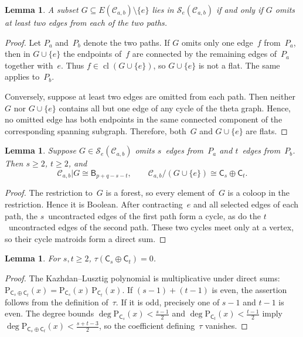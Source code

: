 \documentclass[12pt,letterpaper,english]{amsart}
\theoremstyle{teoremas}
\newtheorem{lemma}[theorem]{Lemma}
\theoremstyle{definition}
\DeclareMathOperator{\cl}{cl}
\newcommand{\C}{\mathsf{C}}
\newcommand{\B}{\mathsf{B}}
\newcommand{\PP}{\mathrm{P}}
\newcommand{\Se}{\mathcal{S}_e}
\begin{document}
\begin{lemma}\label{lem:glued-Se}
A subset $G \subseteq E(\mathcal{C}_{a,b}) \setminus \{e\}$ lies in
$\Se(\mathcal{C}_{a,b})$ if and only if $G$ omits at least two edges
from each of the two paths.
\end{lemma}

\begin{proof}
Let $P_a$ and~$P_b$ denote the two paths.
If $G$ omits only one edge~$f$ from~$P_a$, then in $G \cup \{e\}$
the endpoints of~$f$ are connected by the remaining edges of~$P_a$
together with~$e$.
Thus $f \in \cl(G \cup \{e\})$, so $G \cup \{e\}$ is not a flat.
The same applies to~$P_b$.

Conversely, suppose at least two edges are omitted from each path.
Then neither~$G$ nor $G \cup \{e\}$ contains all but one edge of any
cycle of the theta graph.
Hence, no omitted edge has both endpoints in the same connected
component of the corresponding spanning subgraph.
Therefore, both~$G$ and $G \cup \{e\}$ are flats.
\end{proof}

\begin{lemma}\label{lem:glued-minors}
Suppose $G \in \Se(\mathcal{C}_{a,b})$ omits $s$~edges from~$P_a$
and $t$~edges from~$P_b$.  Then $s \ge 2$, $t \ge 2$, and
\[
\mathcal{C}_{a,b}|G \cong \B_{p+q-s-t},\qquad
\mathcal{C}_{a,b}/(G \cup \{e\}) \cong \C_s \oplus \C_t.
\]
\end{lemma}

\begin{proof}
The restriction to~$G$ is a forest, so every element of~$G$ is a
coloop in the restriction.  Hence it is Boolean.
After contracting~$e$ and all selected edges of each path,
the $s$~uncontracted edges of the first path form a cycle, as do
the $t$~uncontracted edges of the second path.
These two cycles meet only at a vertex, so their cycle matroids
form a direct sum.
\end{proof}

\begin{lemma}\label{lem:glued-tau}
For $s, t \ge 2$, $\tau(\C_s \oplus \C_t) = 0$.
\end{lemma}

\begin{proof}
The Kazhdan--Lusztig polynomial is multiplicative under direct sums:
$\PP_{\C_s \oplus \C_t}(x) = \PP_{\C_s}(x)\, \PP_{\C_t}(x)$.
If $(s-1) + (t-1)$ is even, the assertion follows from the definition
of~$\tau$.  If it is odd, precisely one of $s-1$ and $t-1$ is even.
The degree bounds $\deg \PP_{\C_s}(x) < \frac{s-1}{2}$ and
$\deg \PP_{\C_t}(x) < \frac{t-1}{2}$ imply
$\deg \PP_{\C_s \oplus \C_t}(x) < \frac{s+t-3}{2}$, so the
coefficient defining~$\tau$ vanishes.
\end{proof}
\end{document}
